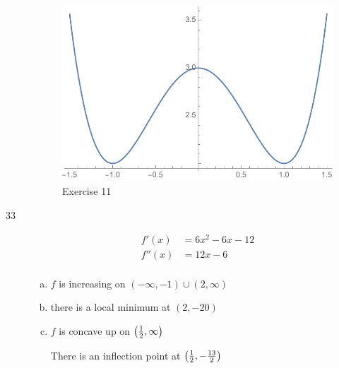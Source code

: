 \documentclass[letterpaper, landscape]{exam}
\begin{document}
\begin{description}
      \begin{figure}[H]
        \centering
        \includegraphics[scale = 0.6]{ex11.pdf}
        \caption{Exercise 11}
        \label{fig:ex11}
      \end{figure}

    \newpage

    \newpage

    \item[33]
      \begin{align*}
        f'(x)  & = 6x^2 - 6x - 12 \\
        f''(x) & = 12x - 6 \\
      \end{align*}

      \begin{enumerate}[(a)]
        \item $f$ is increasing on $(-\infty, -1) \cup (2, \infty)$

        \item there is a local minimum at $(2, -20)$ 

        \item $f$ is concave up on $\del{ \frac{1}{2}, \infty }$ 
          
          There is an inflection point at $\del{ \frac{1}{2}, - \frac{13}{2} }$ 

      \end{enumerate}


\end{description}
\end{document}
